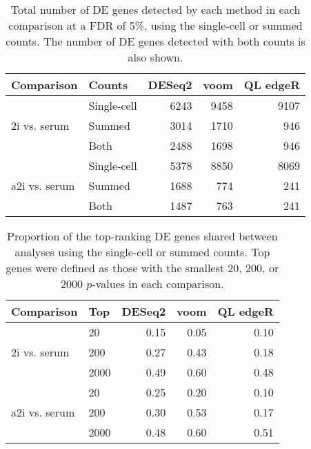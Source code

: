 \documentclass[oupdraft]{bio}
\begin{document}
\begin{table}[!p]
\caption{Total number of DE genes detected by each method in each comparison at a FDR of 5\%, using the single-cell or summed counts.
The number of DE genes detected with both counts is also shown.
}
\label{tab:realnum}
\begin{center}
\begin{tabular}{l l r r r}
\hline
\textbf{Comparison} & \textbf{Counts} & \textbf{DESeq2} & \textbf{voom} & \textbf{QL edgeR} \\
\hline
\multirow{3}{*}{2i vs. serum} 
& Single-cell & 6243 & 9458 & 9107 \\
& Summed & 3014 & 1710 & 946 \\
& Both & 2488 & 1698 & 946 \\
\hline
\multirow{3}{*}{a2i vs. serum} 
& Single-cell & 5378 & 8850 & 8069 \\
& Summed & 1688 & 774 & 241 \\
& Both & 1487 & 763 & 241 \\
\hline
\end{tabular}
\end{center}
\end{table}

\begin{table}[!p]
\caption{Proportion of the top-ranking DE genes shared between analyses using the single-cell or summed counts.
Top genes were defined as those with the smallest 20, 200, or 2000 $p$-values in each comparison.
}
\label{tab:realrank}
\begin{center}
\begin{tabular}{l l r r r}
\hline
\textbf{Comparison} & \textbf{Top} & \textbf{DESeq2} & \textbf{voom} & \textbf{QL edgeR} \\
\hline
\multirow{3}{*}{2i vs. serum} 
& 20 & 0.15 & 0.05 & 0.10 \\
& 200 & 0.27 & 0.43 & 0.18 \\
& 2000 & 0.49 & 0.60 & 0.48 \\
\hline
\multirow{3}{*}{a2i vs. serum} 
& 20 & 0.25 & 0.20 & 0.10 \\
& 200 & 0.30 & 0.53 & 0.17 \\
& 2000 & 0.48 & 0.60 & 0.51 \\
\hline
\end{tabular}
\end{center}
\end{table}
\end{document}
